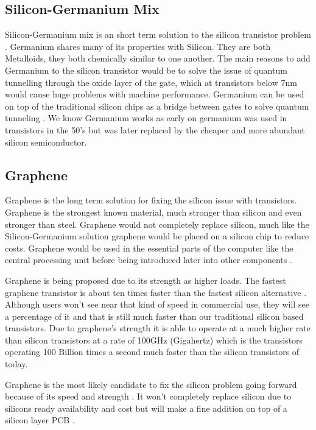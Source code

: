 \documentclass[journal]{IEEEtran}
\begin{document}
\subsection{Silicon-Germanium Mix}
Silicon-Germanium mix is an short term solution to the silicon transistor problem \cite{8947469320180101}. Germanium shares many of its properties with Silicon. They are both Metalloids, they both chemically similar to one another. The main reasons to add Germanium to the silicon transistor would be to solve the issue of quantum tunnelling through the oxide layer of the gate, which at transistors below 7nm would cause huge problems with machine performance. Germanium can be used on top of the traditional silicon chips as a bridge between gates to solve quantum tunneling \cite{ye_2016}. We know Germanium works as early on germanium was used in transistors in the 50's but was later replaced by the cheaper and more abundant silicon semiconductor. 

\subsection{Graphene}
Graphene is the long term solution for fixing the silicon issue with transistors. Graphene is the strongest known material, much stronger than silicon and even stronger than steel. Graphene would not completely replace silicon, much like the Silicon-Germanium solution graphene would be placed on a silicon chip to reduce costs. Graphene would be used in the essential parts of the computer like the central processing unit before being introduced later into other components \cite{48600520130101}.

Graphene is being proposed due to its strength as higher loads. The fastest graphene transistor is about ten times faster than the fastest silicon alternative \cite{bourzac_2010}. Although users won't see near that kind of speed in commercial use, they will see a percentage of it and that is still much faster than our traditional silicon based transistors. Due to graphene's strength it is able to operate at a much higher rate than silicon transistors at a rate of 100GHz (Gigahertz) which is the transistors operating 100 Billion times a second much faster than the silicon transistors of today.

Graphene is the most likely candidate to fix the silicon problem going forward because of its speed and strength \cite{VanNoorden2006}. It won't completely replace silicon due to silicons ready availability and cost but will make a fine addition on top of a silicon layer PCB \cite{S016943321731100520170831}. 
\end{document}

